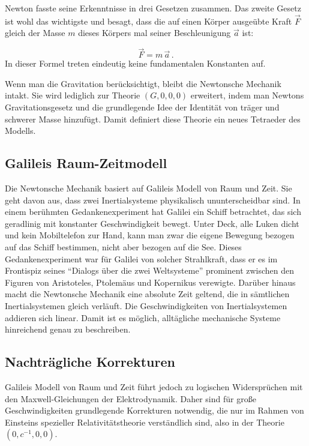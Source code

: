 \documentclass{scrartcl}
\begin{document}
Newton fasste seine Erkenntnisse in drei Gesetzen zusammen. Das zweite Gesetz ist wohl das wichtigste und besagt, dass die auf einen Körper ausgeübte Kraft $\vec{F}$ gleich der Masse $m$ dieses Körpers mal seiner Beschleunigung $\vec{a}$ ist:

\begin{equation*}
  \vec{F} =m\, \vec{a}\,.
\end{equation*}
%
In dieser Formel treten eindeutig keine fundamentalen Konstanten auf.

Wenn man die Gravitation berücksichtigt, bleibt die Newtonsche Mechanik intakt. Sie wird lediglich zur Theorie $(G,0,0,0)$ erweitert, indem man Newtons Gravitationsgesetz und die grundlegende Idee der Identität von träger und schwerer Masse hinzufügt. Damit definiert diese Theorie ein neues Tetraeder des Modells.


\subsection*{Galileis Raum-Zeitmodell}

Die Newtonsche Mechanik basiert auf Galileis Modell von Raum und Zeit. Sie geht davon aus, dass zwei Inertialsysteme physikalisch ununterscheidbar sind. In einem berühmten Gedankenexperiment hat Galilei ein Schiff betrachtet, das sich geradlinig mit konstanter Geschwindigkeit bewegt. Unter Deck, alle Luken dicht und kein Mobiltelefon zur Hand, kann man zwar die eigene Bewegung bezogen auf das Schiff bestimmen, nicht aber bezogen auf die See. Dieses Gedankenexperiment war für Galilei von solcher Strahlkraft, dass er es im Frontispiz seines \enquote{Dialogs über die zwei Weltsysteme} prominent zwischen den Figuren von Aristoteles, Ptolemäus und Kopernikus verewigte. Darüber hinaus macht die Newtonsche Mechanik eine absolute Zeit geltend, die in sämtlichen Inertialsystemen gleich verläuft. Die Geschwindigkeiten von Inertialsystemen addieren sich linear. Damit ist es möglich, alltägliche mechanische Systeme hinreichend genau zu beschreiben.


\subsection*{Nachträgliche Korrekturen}

Galileis Modell von Raum und Zeit führt jedoch zu logischen Widersprüchen mit den Maxwell-Gleichungen der Elektrodynamik. Daher sind für große Geschwindigkeiten grundlegende Korrekturen notwendig, die nur im Rahmen von Einsteins spezieller Relativitätstheorie verständlich sind, also in der Theorie $(0,c^{-1},0,0)$.
\end{document}
